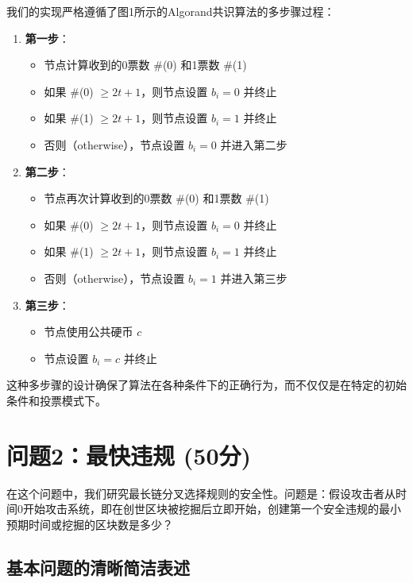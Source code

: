 \documentclass[12pt,a4paper]{article}
\begin{document}
\begin{CJK}{UTF8}{gbsn}
我们的实现严格遵循了图1所示的Algorand共识算法的多步骤过程：

\begin{enumerate}
    \item \textbf{第一步}：
        \begin{itemize}
            \item 节点计算收到的0票数 \#(0) 和1票数 \#(1)
            \item 如果 \#(0) $\geq 2t+1$，则节点设置 $b_i=0$ 并终止
            \item 如果 \#(1) $\geq 2t+1$，则节点设置 $b_i=1$ 并终止
            \item 否则（otherwise），节点设置 $b_i=0$ 并进入第二步
        \end{itemize}
    
    \item \textbf{第二步}：
        \begin{itemize}
            \item 节点再次计算收到的0票数 \#(0) 和1票数 \#(1)
            \item 如果 \#(0) $\geq 2t+1$，则节点设置 $b_i=0$ 并终止
            \item 如果 \#(1) $\geq 2t+1$，则节点设置 $b_i=1$ 并终止
            \item 否则（otherwise），节点设置 $b_i=1$ 并进入第三步
        \end{itemize}
    
    \item \textbf{第三步}：
        \begin{itemize}
            \item 节点使用公共硬币 $c$
            \item 节点设置 $b_i=c$ 并终止
        \end{itemize}
\end{enumerate}

这种多步骤的设计确保了算法在各种条件下的正确行为，而不仅仅是在特定的初始条件和投票模式下。

\section{问题2：最快违规 (50分)}

在这个问题中，我们研究最长链分叉选择规则的安全性。问题是：假设攻击者从时间0开始攻击系统，即在创世区块被挖掘后立即开始，创建第一个安全违规的最小预期时间或挖掘的区块数是多少？

\subsection{基本问题的清晰简洁表述}


\end{CJK}
\end{document}
